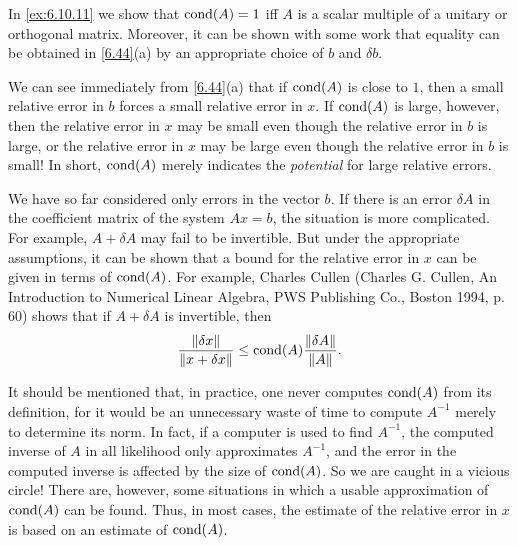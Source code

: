 \begin{note}
  In \cref{ex:6.10.11} we show that \(\cond{A} = 1\) iff \(A\) is a scalar multiple of a unitary or orthogonal matrix.
  Moreover, it can be shown with some work that equality can be obtained in \cref{6.44}(a) by an appropriate choice of \(b\) and \(\delta b\).

  We can see immediately from \cref{6.44}(a) that if \(\cond{A}\) is close to \(1\), then a small relative error in \(b\) forces a small relative error in \(x\).
  If \(\cond{A}\) is large, however, then the relative error in \(x\) may be small even though the relative error in \(b\) is large, or the relative error in \(x\) may be large even though the relative error in \(b\) is small!
  In short, \(\cond{A}\) merely indicates the \emph{potential} for large relative errors.

  We have so far considered only errors in the vector \(b\).
  If there is an error \(\delta A\) in the coefficient matrix of the system \(Ax = b\), the situation is more complicated.
  For example, \(A + \delta A\) may fail to be invertible.
  But under the appropriate assumptions, it can be shown that a bound for the relative error in \(x\) can be given in terms of \(\cond{A}\).
  For example, Charles Cullen (Charles G. Cullen, An Introduction to Numerical Linear Algebra, PWS Publishing Co., Boston 1994, p. 60) shows that if \(A + \delta A\) is invertible, then
  \[
    \dfrac{\norm{\delta x}}{\norm{x + \delta x}} \leq \cond{A} \dfrac{\norm{\delta A}}{\norm{A}}.
  \]

  It should be mentioned that, in practice, one never computes \(\cond{A}\) from its definition, for it would be an unnecessary waste of time to compute \(A^{-1}\) merely to determine its norm.
  In fact, if a computer is used to find \(A^{-1}\), the computed inverse of \(A\) in all likelihood only approximates \(A^{-1}\), and the error in the computed inverse is affected by the size of \(\cond{A}\).
  So we are caught in a vicious circle!
  There are, however, some situations in which a usable approximation of \(\cond{A}\) can be found.
  Thus, in most cases, the estimate of the relative error in \(x\) is based on an estimate of \(\cond{A}\).
\end{note}

\exercisesection

\begin{ex}\label{ex:6.10.11}
\end{ex}
